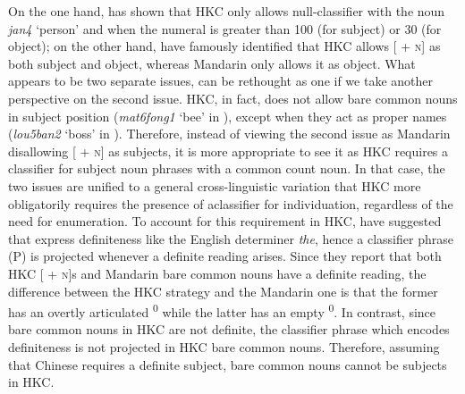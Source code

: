 \documentclass[output=paper]{langsci/langscibook}
\begin{document}
On the one hand,  has shown that \gls{HKC} only allows null-classifier  with the noun
\emph{jan4} ‘person’ and when the numeral is greater than 100 (for subject) or
30 (for object); on the other hand, \citet{ChengSybesma1999} have famously
identified that \gls{HKC} allows [\Clf{} + \textsc{n}]
as both subject and object, whereas Mandarin only allows it as
object.  What appears to be two separate issues, can be rethought as one if we
take another perspective on the second issue. \gls{HKC}, in fact, does not allow bare common nouns in subject position
(\emph{mat6fong1} \enquote*{bee} in ), except when they act as
proper names (\emph{lou5ban2} \enquote*{boss} in ).  Therefore,
instead of viewing the second issue as Mandarin disallowing
[\Clf{} + \textsc{n}] as subjects, it is more appropriate to see it as
\gls{HKC} requires a classifier for
subject noun phrases with a common count noun. In that case, the two issues are
unified to a general cross-linguistic variation that \gls{HKC} more obligatorily requires the presence of a\largerpage[1]
classifier for individuation, regardless of the need for
enumeration. To account for this requirement in \gls{HKC}, \citet{ChengSybesma1999} have suggested that 
express definiteness like the English determiner \emph{the}, hence a
classifier phrase (\Clf{}P) is projected whenever a definite
reading arises. Since they report that both \gls{HKC} [\Clf{} + \textsc{n}]s
and Mandarin bare common nouns have a definite reading, the
difference between the \gls{HKC} strategy and the
Mandarin one is that the former has an overtly articulated
\Clf{}\textsuperscript{0} while the latter has an empty
\Clf{}\textsuperscript{0}. In contrast, since bare common nouns in \gls{HKC}
are not definite, the classifier phrase which encodes
definiteness is not projected in \gls{HKC} bare common
nouns. Therefore, assuming that Chinese requires a definite subject, bare
common nouns cannot be subjects in \gls{HKC}.
\end{document}
